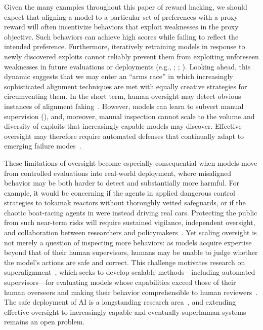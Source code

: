 \documentclass[10pt]{article}
\def\citep#1{}%
\def\citealp#1{}%
\begin{document}
Given the many examples throughout this paper of reward hacking, we should expect that aligning a model to a particular set of preferences with a proxy reward will often incentivize behaviors that exploit weaknesses in the proxy objective. 
Such behaviors can achieve high scores while failing to reflect the intended preference. 
Furthermore, iteratively retraining models in response to newly discovered exploits cannot reliably prevent them from exploiting unforeseen weaknesses in future evaluations or deployments (e.g., ; ; \citealp{wei2024simplesyntheticdatareduces, vanderweij2025aisandbagginglanguagemodels, wilke2001evolution}).
Looking ahead, this dynamic suggests that we may enter an ``arms race'' in which increasingly sophisticated alignment techniques are met with equally creative strategies for circumventing them. 
In the short term, human oversight may detect obvious instances of alignment faking~\citep{greenblatt2024alignmentfakinglargelanguage}. 
However, models can learn to subvert manual supervision (), and, moreover, manual inspection cannot scale to the volume and diversity of exploits that increasingly capable models may discover.
Effective oversight may therefore require automated defenses that continually adapt to emerging failure modes~\citep{dharna2025foundationmodelselfplayopenended, samvelyan2024rainbow}.

These limitations of oversight become especially consequential when models move from controlled evaluations into real-world deployment, where misaligned behavior may be both harder to detect and substantially more harmful. 
For example, it would be concerning if the agents in  applied dangerous control strategies to tokamak reactors without thoroughly vetted safeguards, or if the chaotic boat-racing agents in  were instead driving real cars. 
Protecting the public from such near-term risks will require sustained vigilance, independent oversight, and collaboration between researchers and policymakers~\citep{un_ai_panel_2026_preliminary_report, Bengio2024risk}.
Yet scaling oversight is not merely a question of inspecting more behaviors: as models acquire expertise beyond that of their human supervisors, humans may be unable to judge whether the model's actions are safe and correct. 
This challenge motivates research on superalignment~\citep{leike2023superalignment}, which seeks to develop scalable methods---including automated supervisors---for evaluating models whose capabilities exceed those of their human overseers and making their behavior comprehensible to human reviewers~\citep{burns2023weaktostronggeneralizationelicitingstrong}. 
The safe deployment of AI is a longstanding research area~\citep{10.1609/aimag.v28i4.2065, JMLR:v16:garcia15a, ji2025aialignmentcomprehensivesurvey}, and extending effective oversight to increasingly capable and eventually superhuman systems remains an open problem.
\end{document}
